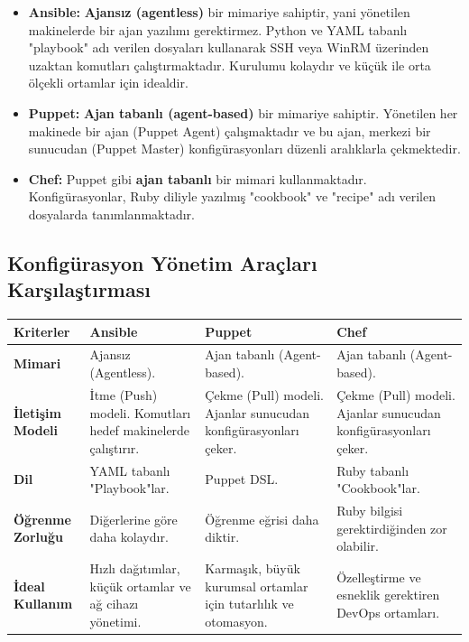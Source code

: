 \begin{itemize}
    \item \textbf{Ansible:} \textbf{Ajansız (agentless)} bir mimariye sahiptir, yani yönetilen makinelerde bir ajan yazılımı gerektirmez. Python ve YAML tabanlı "playbook" adı verilen dosyaları kullanarak SSH veya WinRM üzerinden uzaktan komutları çalıştırmaktadır. Kurulumu kolaydır ve küçük ile orta ölçekli ortamlar için idealdir.
    \item \textbf{Puppet:} \textbf{Ajan tabanlı (agent-based)} bir mimariye sahiptir. Yönetilen her makinede bir ajan (Puppet Agent) çalışmaktadır ve bu ajan, merkezi bir sunucudan (Puppet Master) konfigürasyonları düzenli aralıklarla çekmektedir.
    \item \textbf{Chef:} Puppet gibi \textbf{ajan tabanlı} bir mimari kullanmaktadır. Konfigürasyonlar, Ruby diliyle yazılmış "cookbook" ve "recipe" adı verilen dosyalarda tanımlanmaktadır.
\end{itemize}

\subsection{Konfigürasyon Yönetim Araçları Karşılaştırması}

\begin{longtable}{|p{4cm}|p{4cm}|p{4cm}|p{4cm}|}
\hline
\textbf{Kriterler} & \textbf{Ansible} & \textbf{Puppet} & \textbf{Chef} \\
\hline
\textbf{Mimari} & Ajansız (Agentless). & Ajan tabanlı (Agent-based). & Ajan tabanlı (Agent-based). \\
\hline
\textbf{İletişim Modeli} & İtme (Push) modeli. Komutları hedef makinelerde çalıştırır. & Çekme (Pull) modeli. Ajanlar sunucudan konfigürasyonları çeker. & Çekme (Pull) modeli. Ajanlar sunucudan konfigürasyonları çeker. \\
\hline
\textbf{Dil} & YAML tabanlı "Playbook"lar. & Puppet DSL. & Ruby tabanlı "Cookbook"lar. \\
\hline
\textbf{Öğrenme Zorluğu} & Diğerlerine göre daha kolaydır. & Öğrenme eğrisi daha diktir. & Ruby bilgisi gerektirdiğinden zor olabilir. \\
\hline
\textbf{İdeal Kullanım} & Hızlı dağıtımlar, küçük ortamlar ve ağ cihazı yönetimi. & Karmaşık, büyük kurumsal ortamlar için tutarlılık ve otomasyon. & Özelleştirme ve esneklik gerektiren DevOps ortamları. \\
\hline
\end{longtable}

